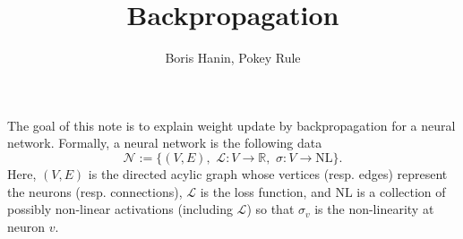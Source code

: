\documentclass[12pt,reqno]{amsart}
\title{Backpropagation}
\newcommand{\R}{{\mathbb R}}
\newcommand{\set}[1]{\{#1\}}
\newcommand{\gives}{\ensuremath{\rightarrow}}
\begin{document}
\author{Boris Hanin, Pokey Rule}

\address{Department of Mathematics, MIT, Cambridge, MA 02139}
\address{??}

\maketitle
The goal of this note is to explain weight update by backpropagation for a neural network. Formally, a neural network is the following data
\[\mathcal N := \set{(V, E),\,\,   \mathcal L:V\gives \R,\,\, \sigma:V\gives \text{NL}}.\]
Here, $(V,E)$ is the directed acylic graph whose vertices (resp. edges) represent the neurons (resp. connections), $\mathcal L$ is the loss function, and $\text{NL}$ is a collection of possibly non-linear activations (including $\mathcal L$) so that $\sigma_v$ is the non-linearity at neuron $v.$ 
\end{document}
